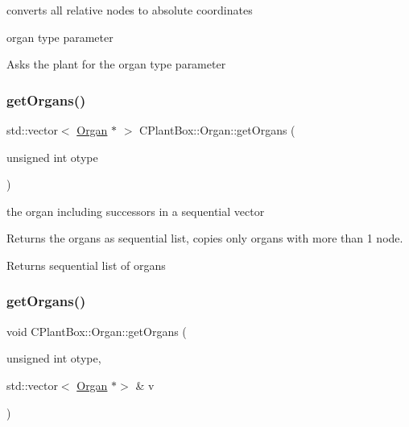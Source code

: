 converts all relative nodes to absolute coordinates 

organ type parameter

Asks the plant for the organ type parameter \mbox{\label{classCPlantBox_1_1Organ_aee7e856229fd2ac996c0033aacead4c1}} 
\subsubsection{\texorpdfstring{get\+Organs()}{getOrgans()}\hspace{0.1cm}{\footnotesize\ttfamily [1/2]}}
{\footnotesize\ttfamily std\+::vector$<$ \hyperlink{classCPlantBox_1_1Organ}{Organ} $\ast$ $>$ C\+Plant\+Box\+::\+Organ\+::get\+Organs (\begin{DoxyParamCaption}\item[{unsigned int}]{otype }\end{DoxyParamCaption})}



the organ including successors in a sequential vector 

Returns the organs as sequential list, copies only organs with more than 1 node.

\begin{DoxyReturn}{Returns}
sequential list of organs 
\end{DoxyReturn}
\mbox{\label{classCPlantBox_1_1Organ_a96e286dd479eca6b338630225939c636}} 
\subsubsection{\texorpdfstring{get\+Organs()}{getOrgans()}\hspace{0.1cm}{\footnotesize\ttfamily [2/2]}}
{\footnotesize\ttfamily void C\+Plant\+Box\+::\+Organ\+::get\+Organs (\begin{DoxyParamCaption}\item[{unsigned int}]{otype,  }\item[{std\+::vector$<$ \hyperlink{classCPlantBox_1_1Organ}{Organ} $\ast$$>$ \&}]{v }\end{DoxyParamCaption})}



